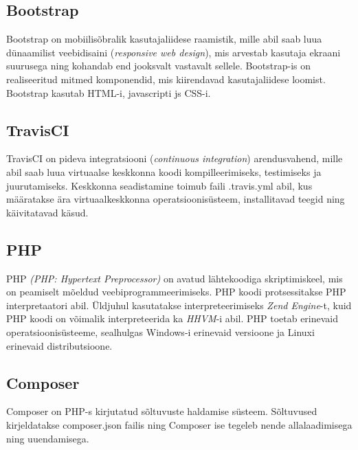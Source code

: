 \documentclass[a4paper,12pt]{article} %
\begin{document}
\subsection{Bootstrap}
Bootstrap on mobiilisõbralik kasutajaliidese raamistik, mille abil saab luua dünaamilist veebidisaini (\textit{responsive web design}), mis arvestab kasutaja ekraani suurusega ning kohandab end jooksvalt vastavalt sellele. Bootstrap-is on realiseeritud mitmed komponendid, mis kiirendavad kasutajaliidese loomist. Bootstrap kasutab HTML-i, javascripti js CSS-i. \cite{Bootstrap}
\subsection{TravisCI}
TravisCI on pideva integratsiooni (\textit{continuous integration}) arendusvahend, mille abil saab luua virtuaalse keskkonna koodi kompilleerimiseks, testimiseks ja juurutamiseks. Keskkonna seadistamine toimub faili .travis.yml abil, kus määratakse ära virtuaalkeskkonna operatsioonisüsteem, installitavad teegid ning käivitatavad käsud. \cite{TravisCI}
\subsection{PHP}
PHP \textit{(PHP: Hypertext Preprocessor)} on avatud lähtekoodiga skriptimiskeel, mis on peamiselt mõeldud veebiprogrammeerimiseks. \cite{What_Is_PHP} PHP koodi protsessitakse PHP interpretaatori abil. Üldjuhul kasutatakse interpreteerimiseks \textit{Zend Engine}-t, kuid PHP koodi on võimalik interpreteerida ka \textit{HHVM}-i \cite{HHVM} abil. PHP toetab erinevaid operatsioonisüsteeme, sealhulgas Windows-i erinevaid versioone ja Linuxi erinevaid distributsioone.
\subsection{Composer}
Composer on PHP-s kirjutatud sõltuvuste haldamise süsteem. Sõltuvused kirjeldatakse composer.json failis ning Composer ise tegeleb nende allalaadimisega ning uuendamisega. \cite{Composer}
\end{document}
